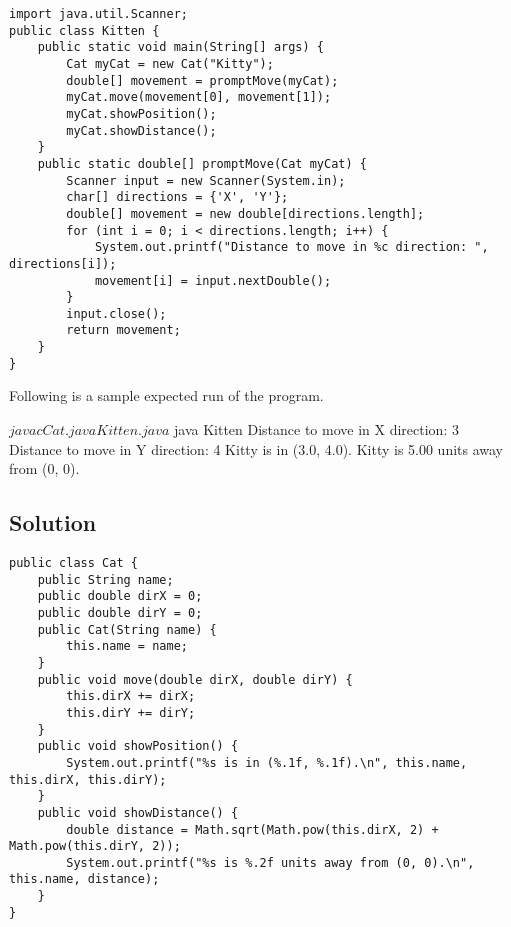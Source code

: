 \lstset{caption=}
\lstset{language=Java,tabsize=4}
\begin{lstlisting}
import java.util.Scanner;
public class Kitten {
	public static void main(String[] args) {
		Cat myCat = new Cat("Kitty");
		double[] movement = promptMove(myCat);
		myCat.move(movement[0], movement[1]);
		myCat.showPosition();
		myCat.showDistance();
	}
	public static double[] promptMove(Cat myCat) {
		Scanner input = new Scanner(System.in);
		char[] directions = {'X', 'Y'};
		double[] movement = new double[directions.length];
		for (int i = 0; i < directions.length; i++) {
			System.out.printf("Distance to move in %c direction: ", directions[i]);
			movement[i] = input.nextDouble();
		}
		input.close();
		return movement;
	}
}
\end{lstlisting}

\newpage

Following is a sample expected run of the program.

\begin{terminal}
$ javac Cat.java Kitten.java
$ java Kitten
Distance to move in X direction: 3
Distance to move in Y direction: 4
Kitty is in (3.0, 4.0).
Kitty is 5.00 units away from (0, 0).
\end{terminal}

\subsection*{Solution}

\lstset{language=Java,tabsize=4}
\begin{lstlisting}
public class Cat {
	public String name;
	public double dirX = 0;
	public double dirY = 0;
	public Cat(String name) {
		this.name = name;
	}
	public void move(double dirX, double dirY) {
		this.dirX += dirX;
		this.dirY += dirY;
	}
	public void showPosition() {
		System.out.printf("%s is in (%.1f, %.1f).\n", this.name, this.dirX, this.dirY);
	}
	public void showDistance() {
		double distance = Math.sqrt(Math.pow(this.dirX, 2) + Math.pow(this.dirY, 2));
		System.out.printf("%s is %.2f units away from (0, 0).\n", this.name, distance);
	}
}
\end{lstlisting}
